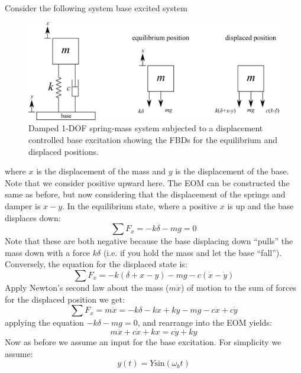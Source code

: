 \documentclass[12pt,letter]{article}
\numberwithin{ex}{section} %
\numberwithin{re}{section} %
\numberwithin{vcs}{section} %
\begin{document}
			Consider the following system base excited system
			\begin{figure}[H]
				\centering
				\includegraphics[]{../figures/1_DOF_spring_dashpot_mass_vertical_base_excited_FBD.png}
				\caption{Damped 1-DOF spring-mass system subjected to a displacement controlled base excitation showing the FBDs for the equilibrium and displaced positions.}
				\label{fig:1_DOF_spring_dashpot_mass_vertical_base_excited_FBD}
			\end{figure}
			where $x$ is the displacement of the mass and $y$ is the displacement of the base. Note that we consider positive upward here. The EOM can be constructed the same as before, but now considering that the displacement of the springs and damper is $x-y$.  In the equilibrium state, where a positive $x$ is up and the base displaces down:
			\begin{equation}
			\sum F_x = -k\delta -mg =0
			\end{equation}	
			Note that these are both negative because the base displacing down ``pulls'' the mass down with a force $k\delta$ (i.e. if you hold the mass and let the base ``fall''). Conversely, the equation for the displaced state is:
			\begin{equation}
			\sum F_x = -k(\delta + x - y) -mg -c(\dot{x} -\dot{y})
			\end{equation}	
			Apply Newton's second law about the mass ($m\ddot{x}$) of motion to the sum of forces for the displaced position we get:
			\begin{equation}
			\sum F_x = m\ddot{x} = -k\delta -kx + ky -mg -c\dot{x} +c\dot{y}
			\end{equation}	
			applying the equation $-k\delta -mg =0$, and rearrange into the EOM yields:	
			\begin{equation}
			m\ddot{x} + c\dot{x} + kx = c\dot{y} + ky 
			\end{equation}
			Now as before we assume an input for the base excitation. For simplicity we assume:
			\begin{equation}
			y(t) = Y\text{sin}(\omega_b t)
			\end{equation}
\end{document}
